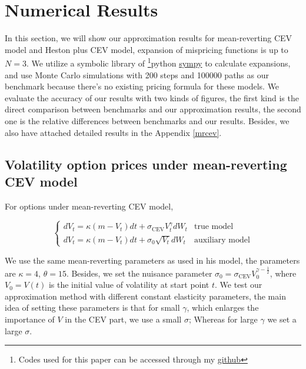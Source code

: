 \chapter{Numerical Results}\label{ch4}

In this section, we will show our approximation results for mean-reverting CEV model and Heston plus CEV model, expansion of mispricing functions is up to $N=3$. We utilize a symbolic library of \footnote{Codes used for this paper can be accessed through my \href{https://github.com/ywang408/master-thesis-code}{github}}{python} \href{https://www.sympy.org/en/index.html}{sympy} to calculate expansions, and use Monte Carlo simulations with 200 steps and 100000 paths as our benchmark because there's no existing pricing formula for these models. We evaluate the accuracy of our results with two kinds of figures, the first kind is the direct comparison between benchmarks and our approximation results, the second one is the relative differences between benchmarks and our results. Besides, we also have attached detailed results in the Appendix \ref{mrcev}.

\section{Volatility option prices under mean-reverting CEV model}

For options under mean-reverting CEV model,

$$
  \begin{cases}
    d V_t=\kappa(m- V_t) d t+\sigma_{\text{CEV}} V^{\gamma}_t d W_t &\text{true model}\\
    d V_t=\kappa(m - V_t) d t+\sigma_0 \sqrt{V_t} d W_t &\text{auxiliary model}
  \end{cases}
$$

We use the same mean-reverting parameters as \cite{grunbichler_valuing_1996} used in his model, the parameters are $\kappa=4$, $\theta=15$. Besides, we set the nuisance parameter $\sigma_0 = \sigma_{\text{CEV}} V_0^{\gamma-\frac{1}{2}}$, where $V_0=V(t)$ is the initial value of volatility at start point $t$. We test our approximation method with different constant elasticity parameters, the main idea of setting these parameters is that for small $\gamma$, which enlarges the importance of $V$ in the CEV part, we use a small $\sigma$; Whereas for large $\gamma$ we set a large $\sigma$. 

